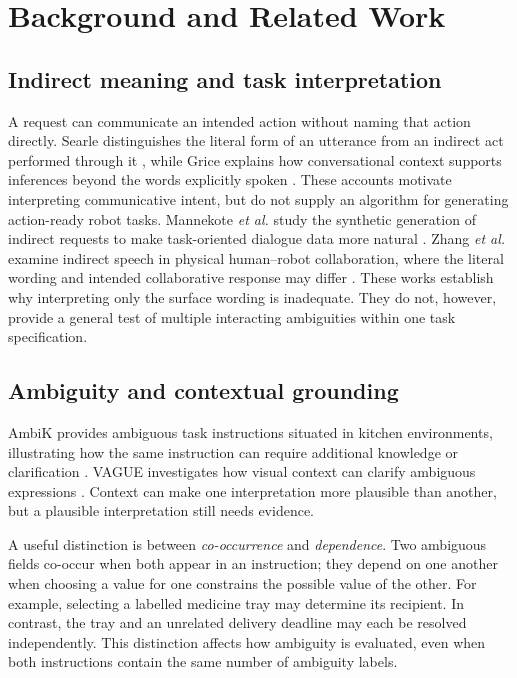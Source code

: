 \documentclass[10pt,conference]{IEEEtran}
\begin{document}
\section{Background and Related Work}
\subsection{Indirect meaning and task interpretation}
A request can communicate an intended action without naming that action directly. Searle distinguishes the literal form of an utterance from an indirect act performed through it \cite{searle1975}, while Grice explains how conversational context supports inferences beyond the words explicitly spoken \cite{grice1975}. These accounts motivate interpreting communicative intent, but do not supply an algorithm for generating action-ready robot tasks. Mannekote \emph{et al.} study the synthetic generation of indirect requests to make task-oriented dialogue data more natural \cite{mannekote}. Zhang \emph{et al.} examine indirect speech in physical human--robot collaboration, where the literal wording and intended collaborative response may differ \cite{tool}. These works establish why interpreting only the surface wording is inadequate. They do not, however, provide a general test of multiple interacting ambiguities within one task specification.

\subsection{Ambiguity and contextual grounding}
AmbiK provides ambiguous task instructions situated in kitchen environments, illustrating how the same instruction can require additional knowledge or clarification \cite{ambik}. VAGUE investigates how visual context can clarify ambiguous expressions \cite{vague}. Context can make one interpretation more plausible than another, but a plausible interpretation still needs evidence.

A useful distinction is between \emph{co-occurrence} and \emph{dependence}. Two ambiguous fields co-occur when both appear in an instruction; they depend on one another when choosing a value for one constrains the possible value of the other. For example, selecting a labelled medicine tray may determine its recipient. In contrast, the tray and an unrelated delivery deadline may each be resolved independently. This distinction affects how ambiguity is evaluated, even when both instructions contain the same number of ambiguity labels.
\end{document}

